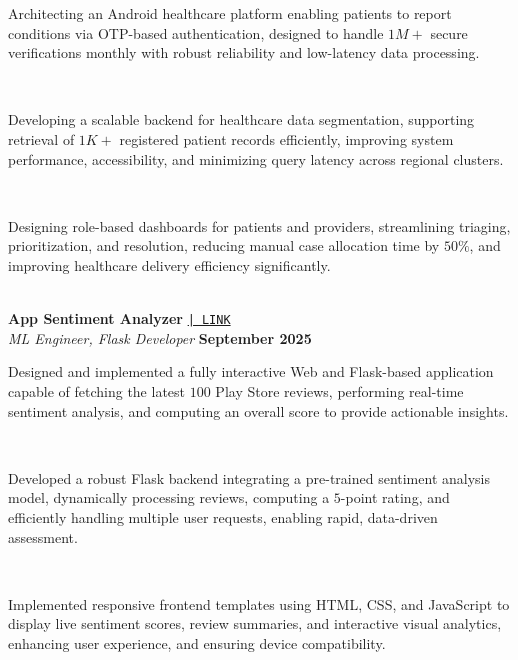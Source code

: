 \documentclass[a4paper,10pt]{article}
\begin{document}
\noindent\makebox[1.5em][l]{--}%
\parbox[t]{\dimexpr\linewidth-1.5em\relax}{%
Architecting an Android healthcare platform enabling patients to report conditions via OTP-based authentication, designed to handle $1M+$ secure verifications monthly with robust reliability and low-latency data processing.} \\[-2pt]

\noindent\makebox[1.5em][l]{--}%
\parbox[t]{\dimexpr\linewidth-1.5em\relax}{%
Developing a scalable backend for healthcare data segmentation, supporting retrieval of $1K+$ registered patient records efficiently, improving system performance, accessibility, and minimizing query latency across regional clusters.} \\[-2pt]

\noindent\makebox[1.5em][l]{--}%
\parbox[t]{\dimexpr\linewidth-1.5em\relax}{%
Designing role-based dashboards for patients and providers, streamlining triaging, prioritization, and resolution, reducing manual case allocation time by $50\%$, and improving healthcare delivery efficiency significantly.} \\[4pt]

\noindent
\textbf{App Sentiment Analyzer} 
\href{https://github.com/ppriyanshu26/SentimentAnalyzer}{\texttt{| LINK}} \\
\textit{ML Engineer, Flask Developer} \hfill \textbf{September 2025} \\[-8pt]

\noindent\makebox[1.5em][l]{--}%
\parbox[t]{\dimexpr\linewidth-1.5em\relax}{%
Designed and implemented a fully interactive Web and Flask-based application capable of fetching the latest $100$ Play Store reviews, performing real-time sentiment analysis, and computing an overall score to provide actionable insights.} \\[-2pt]

\noindent\makebox[1.5em][l]{--}%
\parbox[t]{\dimexpr\linewidth-1.5em\relax}{%
Developed a robust Flask backend integrating a pre-trained sentiment analysis model, dynamically processing reviews, computing a $5$-point rating, and efficiently handling multiple user requests, enabling rapid, data-driven assessment.} \\[-2pt]

\noindent\makebox[1.5em][l]{--}%
\parbox[t]{\dimexpr\linewidth-1.5em\relax}{%
Implemented responsive frontend templates using HTML, CSS, and JavaScript to display live sentiment scores, review summaries, and interactive visual analytics, enhancing user experience, and ensuring device compatibility.} \\[4pt]
\end{document}
